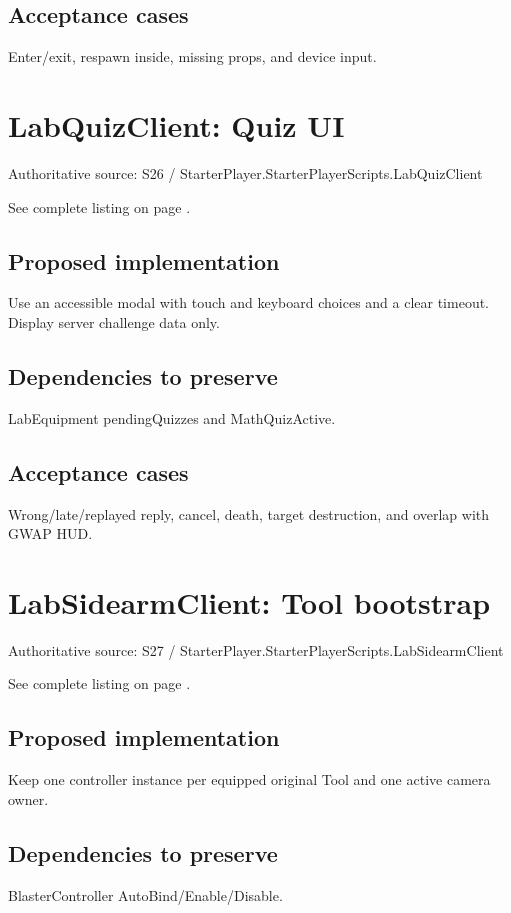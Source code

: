 \subsection{Acceptance cases}
Enter/\allowbreak{}exit, respawn inside, missing props, and device input.\allowbreak{}

\section{LabQuizClient: Quiz UI}
Authoritative source: S26 /\allowbreak{} StarterPlayer.\allowbreak{}StarterPlayerScripts.\allowbreak{}LabQuizClient

See complete listing on page \pageref{src:S26}.

\subsection{Proposed implementation}
Use an accessible modal with touch and keyboard choices and a clear timeout.\allowbreak{} Display server challenge data only.\allowbreak{}

\subsection{Dependencies to preserve}
LabEquipment pendingQuizzes and MathQuizActive.\allowbreak{}

\subsection{Acceptance cases}
Wrong/\allowbreak{}late/\allowbreak{}replayed reply, cancel, death, target destruction, and overlap with GWAP HUD.\allowbreak{}

\section{LabSidearmClient: Tool bootstrap}
Authoritative source: S27 /\allowbreak{} StarterPlayer.\allowbreak{}StarterPlayerScripts.\allowbreak{}LabSidearmClient

See complete listing on page \pageref{src:S27}.

\subsection{Proposed implementation}
Keep one controller instance per equipped original Tool and one active camera owner.\allowbreak{}

\subsection{Dependencies to preserve}
BlasterController AutoBind/\allowbreak{}Enable/\allowbreak{}Disable.\allowbreak{}

